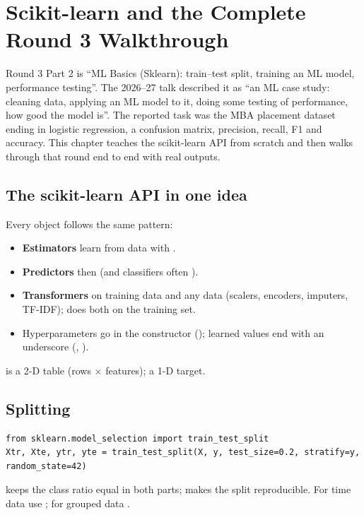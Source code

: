 \chapter{Scikit-learn and the Complete Round 3 Walkthrough}

Round 3 Part 2 is ``ML Basics (Sklearn): train--test split, training an ML model, performance testing''. The 2026--27 talk described it as
``an ML case study: cleaning data, applying an ML model to it, doing some testing of performance, how good the model is''. The reported task was
the MBA placement dataset ending in logistic regression, a confusion matrix, precision, recall, F1 and accuracy. This chapter teaches the
scikit-learn API from scratch and then walks through that round end to end with real outputs.

\section{The scikit-learn API in one idea}
Every object follows the same pattern:
\begin{itemize}
\item \textbf{Estimators} learn from data with .
\item \textbf{Predictors} then  (and classifiers often ).
\item \textbf{Transformers}  on training data and  any data (scalers, encoders, imputers, TF-IDF);  does both on the training set.
\item Hyperparameters go in the constructor (); learned values end with an underscore (, ).
\end{itemize}
 is a 2-D table (rows $\times$ features);  a 1-D target.

\section{Splitting}
\begin{lstlisting}
from sklearn.model_selection import train_test_split
Xtr, Xte, ytr, yte = train_test_split(X, y, test_size=0.2, stratify=y, random_state=42)
\end{lstlisting}
 keeps the class ratio equal in both parts;  makes the split reproducible. For time data use ; for grouped data
.

